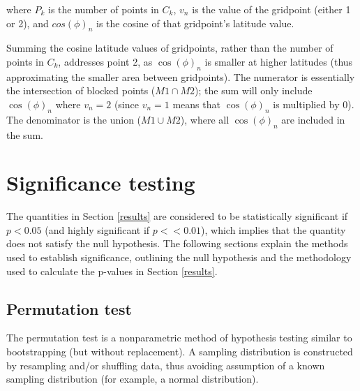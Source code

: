 \documentclass[smallextended]{svjour3}       %
\numberwithin{equation}{section}
\begin{document}
\begin{appendices}
where $P_k$ is the number of points in $C_k$, $v_n$ is the value of the gridpoint (either 1 or 2), and $cos(\phi)_n$ is the cosine of that gridpoint's latitude value. 

Summing the cosine latitude values of gridpoints, rather than the number of points in $C_k$, addresses point 2, as $\cos(\phi)_n$ is smaller at higher latitudes (thus approximating the smaller area between gridpoints). The numerator is essentially the intersection of blocked points ($M1\cap M2$); the sum will only include $\cos(\phi)_n$ where $v_n=2$ (since $v_n=1$ means that $\cos(\phi)_n$ is multiplied by 0). The denominator is the union ($M1\cup M2$), where all $\cos(\phi)_n$ are included in the sum. 

\section{Significance testing}\label{signifappendix}
The quantities in Section \ref{results} are considered to be statistically significant if $p<0.05$ (and highly significant if $p<<0.01$), which implies that the quantity does not satisfy the null hypothesis. The following sections explain the methods used to establish significance, outlining the null hypothesis and the methodology used to calculate the p-values in Section \ref{results}.

\subsection{Permutation test}
The permutation test is a nonparametric method of hypothesis testing similar to bootstrapping (but without replacement). A sampling distribution is constructed by resampling and/or shuffling data, thus avoiding assumption of a known sampling distribution (for example, a normal distribution). 


\end{appendices}
\end{document}

